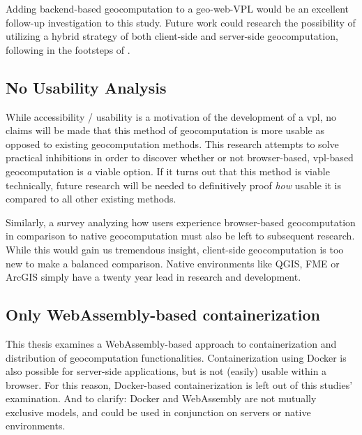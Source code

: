 Adding backend-based geocomputation to a geo-web-VPL would be an excellent follow-up investigation to this study. 
Future work could research the possibility of utilizing a hybrid strategy of both client-side and server-side geocomputation, following in the footsteps of \cite{panidi_hybrid_2015}. 

\subsection*{No Usability Analysis} %
While accessibility / usability is a motivation of the development of a \ac{vpl}, no claims will be made that this method of geocomputation is more usable as opposed to existing geocomputation methods. This research attempts to solve practical inhibitions in order to discover whether or not browser-based, vpl-based geocomputation is \emph{a} viable option. If it turns out that this method is viable technically, future research will be needed to definitively proof \emph{how} usable it is compared to all other existing methods.  


Similarly, a survey analyzing how users experience browser-based geocomputation in comparison to native geocomputation must also be left to subsequent research. While this would gain us tremendous insight, client-side geocomputation is too new to make a balanced comparison. Native environments like QGIS, FME or ArcGIS simply have a twenty year lead in research and development. 




\subsection*{Only WebAssembly-based containerization}
This thesis examines a WebAssembly-based approach to containerization and distribution of geocomputation functionalities. 
Containerization using Docker is also possible for server-side applications, but is not (easily) usable within a browser. 
For this reason, Docker-based containerization is left out of this studies' examination. 
And to clarify: Docker and WebAssembly are not mutually exclusive models, and could be used in conjunction on servers or native environments. 

